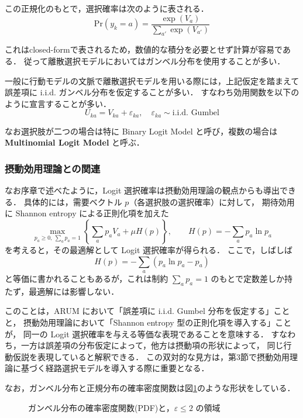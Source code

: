 この正規化のもとで，選択確率は次のように表される．
\begin{equation}
  \text{Pr}(y_k = a) = \frac{\exp(V_a)}{\sum_{a'} \exp(V_{a'})}
\end{equation}

これはclosed-formで表されるため，数値的な積分を必要とせず計算が容易である．
従って離散選択モデルにおいてはガンベル分布を使用することが多い．

一般に行動モデルの文脈で離散選択モデルを用いる際には，上記仮定を踏まえて誤差項に i.i.d. ガンベル分布を仮定することが多い．
すなわち効用関数を以下のように宣言することが多い． 
\begin{equation}
U_{ka} = V_{ka} + \varepsilon_{ka}, \quad \varepsilon_{ka} \sim \text{i.i.d. Gumbel}
\end{equation}

なお選択肢が二つの場合は特に Binary Logit Model と呼び，複数の場合は \textbf{Multinomial Logit Model} と呼ぶ．

\subsubsection{摂動効用理論との関連}
なお序章で述べたように，Logit 選択確率は摂動効用理論の観点からも導出できる．
具体的には，需要ベクトル $p$（各選択肢の選択確率）に対して，
期待効用に Shannon entropy による正則化項を加えた
\begin{equation}\label{eq:perturbed_utility}
\max_{p_a\ge 0,\ \sum_a p_a=1}
\left\{
\sum_a p_a V_a + \mu H(p)
\right\},
\qquad
H(p)=-\sum_a p_a \ln p_a
\tag{3.11}
\end{equation}
を考えると，その最適解として Logit 選択確率が得られる．
ここで，しばしば
\[
H(p)=-\sum_a (p_a\ln p_a-p_a)
\]
と等価に書かれることもあるが，これは制約 $\sum_a p_a=1$ のもとで定数差しか持たず，最適解には影響しない．

このことは，ARUM において「誤差項に i.i.d. Gumbel 分布を仮定する」ことと，
摂動効用理論において「Shannon entropy 型の正則化項を導入する」ことが，
同一の Logit 選択確率を与える等価な表現であることを意味する．
すなわち，一方は誤差項の分布仮定によって，他方は摂動項の形状によって，
同じ行動仮説を表現していると解釈できる．
この双対的な見方は，第3節で摂動効用理論に基づく経路選択モデルを導入する際に重要となる．

なお，ガンベル分布と正規分布の確率密度関数は図\ref{fig:gumbel-pdf}のような形状をしている．
\begin{figure}[hbtp]
  \centering
    \resizebox{.9\linewidth}{!}{%
    }
  \caption{ガンベル分布の確率密度関数(PDF)と，$\varepsilon \le 2$ の領域}
  \label{fig:gumbel-pdf}
\end{figure}


